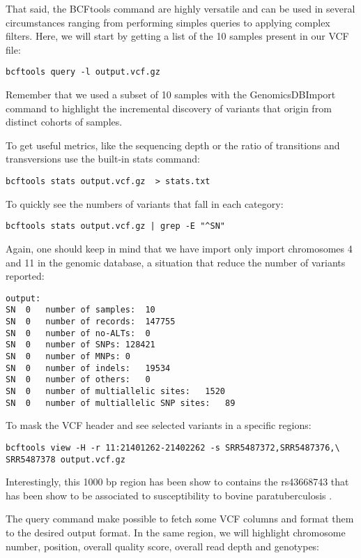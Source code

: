 That said, the BCFtools command are highly versatile and can be used in several circumstances ranging from performing simples queries to applying complex filters. Here, we will start by getting a list of the 10 samples present in our VCF file:

\begin{verbatim}
bcftools query -l output.vcf.gz
\end{verbatim}

Remember that we used a subset of 10 samples with the GenomicsDBImport command to highlight the incremental discovery of variants that origin from distinct cohorts of samples.


To get useful metrics, like the sequencing depth or the ratio of transitions and transversions use the built-in stats command:
\begin{verbatim}
bcftools stats output.vcf.gz  > stats.txt
\end{verbatim}

To quickly see the numbers of variants that fall in each category:
\begin{verbatim}
bcftools stats output.vcf.gz | grep -E "^SN"
\end{verbatim}

Again, one should keep in mind that we have import only import chromosomes 4 and 11 in the genomic database, a situation that reduce the number of variants reported:

\begin{verbatim}
output:
SN	0	number of samples:	10
SN	0	number of records:	147755
SN	0	number of no-ALTs:	0
SN	0	number of SNPs:	128421
SN	0	number of MNPs:	0
SN	0	number of indels:	19534
SN	0	number of others:	0
SN	0	number of multiallelic sites:	1520
SN	0	number of multiallelic SNP sites:	89
\end{verbatim}


To mask the VCF header and see selected variants in a specific regions:
\begin{verbatim}
bcftools view -H -r 11:21401262-21402262 -s SRR5487372,SRR5487376,\
SRR5487378 output.vcf.gz
\end{verbatim}



Interestingly, this 1000 bp region has been show to contains the rs43668743 that has been show to be associated to susceptibility to bovine paratuberculosis \cite{Ariel2021}.

The query command make possible to fetch some VCF columns and format them to the desired output format. In the same region, we will highlight chromosome number, position, overall quality score, overall read depth and genotypes:

